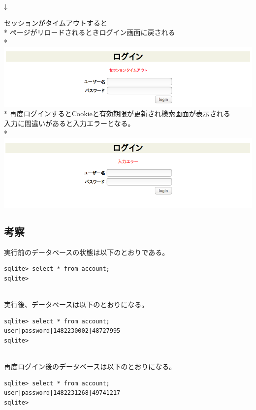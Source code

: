 \documentclass[a4j]{jarticle}
\begin{document}
\begin{center}
{\LARGE↓}

セッションがタイムアウトすると\\*
ページがリロードされるときログイン画面に戻される\\*
\includegraphics[width=\textwidth]{result/result4.png}\\*
再度ログインするとCookieと有効期限が更新され検索画面が表示される
\\
入力に間違いがあると入力エラーとなる。\\*
\includegraphics[width=\textwidth]{result/result5.png}
\end{center}

\subsection{考察}
実行前のデータベースの状態は以下のとおりである。
\begin{screen}
\begin{verbatim}
sqlite> select * from account;
sqlite>
\end{verbatim}
\end{screen}\\

実行後、データベースは以下のとおりになる。
\begin{screen}
\begin{verbatim}
sqlite> select * from account;
user|password|1482230002|48727995
sqlite> 
\end{verbatim}
\end{screen}\\

再度ログイン後のデータベースは以下のとおりになる。
\begin{screen}
\begin{verbatim}
sqlite> select * from account;
user|password|1482231268|49741217
sqlite> 
\end{verbatim}
\end{screen}\\
\end{document}
